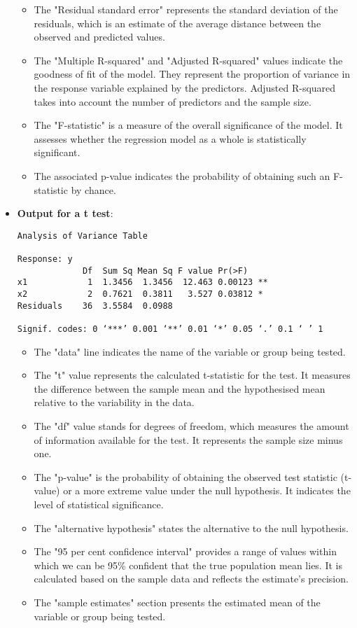 \documentclass[12pt]{article}
\begin{document}
\begin{itemize}
\begin{itemize}
\item The "Residual standard error" represents the standard deviation of the residuals, which is an estimate of the average distance between the observed and predicted values.
\item The "Multiple R-squared" and "Adjusted R-squared" values indicate the goodness of fit of the model. They represent the proportion of variance in the response variable explained by the predictors. Adjusted R-squared takes into account the number of predictors and the sample size.
\item The "F-statistic" is a measure of the overall significance of the model. It assesses whether the regression model as a whole is statistically significant. 
\item The associated p-value indicates the probability of obtaining such an F-statistic by chance.
\end{itemize}

\item \textbf{Output for a t test}:

\begin{mdframed}[backgroundcolor=gray!15, linecolor=black]
\begin{verbatim}
Analysis of Variance Table

Response: y
             Df  Sum Sq Mean Sq F value Pr(>F)    
x1            1  1.3456  1.3456  12.463 0.00123 **
x2            2  0.7621  0.3811   3.527 0.03812 * 
Residuals    36  3.5584  0.0988                   

Signif. codes: 0 ‘***’ 0.001 ‘**’ 0.01 ‘*’ 0.05 ‘.’ 0.1 ‘ ’ 1
\end{verbatim}
\end{mdframed}

\begin{itemize}
\item The "data" line indicates the name of the variable or group being tested.
\item The "t" value represents the calculated t-statistic for the test. It measures the difference between the sample mean and the hypothesised mean relative to the variability in the data.
\item The "df" value stands for degrees of freedom, which measures the amount of information available for the test. It represents the sample size minus one.
\item The "p-value" is the probability of obtaining the observed test statistic (t-value) or a more extreme value under the null hypothesis. It indicates the level of statistical significance.
\item The "alternative hypothesis" states the alternative to the null hypothesis.
\item The "95 per cent confidence interval" provides a range of values within which we can be 95\% confident that the true population mean lies. It is calculated based on the sample data and reflects the estimate's precision.
\item The "sample estimates" section presents the estimated mean of the variable or group being tested.
\end{itemize}


\end{itemize}
\end{document}
